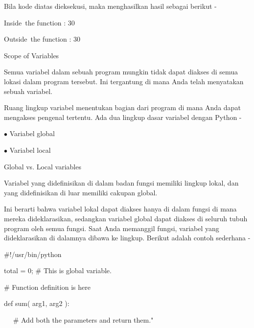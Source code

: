 \noindent 
Bila kode diatas dieksekusi, maka menghasilkan hasil sebagai berikut - \par
\noindent 
 \hspace*{0.5in} Inside~the function :  30 \par
\noindent 
 \hspace*{0.5in} Outside~the function :  30 \par
\noindent 
Scope of Variables \par
\noindent 
Semua variabel dalam sebuah program mungkin tidak dapat diakses di semua lokasi dalam program tersebut. Ini tergantung di mana Anda telah menyatakan sebuah variabel. \par
\noindent 
Ruang lingkup variabel menentukan bagian dari program di mana Anda dapat mengakses pengenal tertentu. Ada dua lingkup dasar variabel dengan Python - \par
\noindent 
 \hspace*{0.5in}  $ \bullet $ Variabel global \par
\noindent 
 \hspace*{0.5in}  $ \bullet $ Variabel local \par
\vspace{12pt}
\noindent 
Global vs. Local variables \par
\noindent 
Variabel yang didefinisikan di dalam badan fungsi memiliki lingkup lokal, dan yang didefinisikan di luar memiliki cakupan global. \par
\noindent 
Ini berarti bahwa variabel lokal dapat diakses hanya di dalam fungsi di mana mereka dideklarasikan, sedangkan variabel global dapat diakses di seluruh tubuh program oleh semua fungsi. Saat Anda memanggil fungsi, variabel yang dideklarasikan di dalamnya dibawa ke lingkup. Berikut adalah contoh sederhana - \par
\noindent 
 \hspace*{0.5in}  $  \#  $!/usr/bin/python \par
\vspace{12pt}
\noindent 
 \hspace*{0.5in} total = 0;  $  \#  $ This is global variable. \par
\noindent 
 \hspace*{0.5in}  $  \#  $ Function definition is here \par
\noindent 
 \hspace*{0.5in} def sum( arg1, arg2 ): \par
\noindent 
 \hspace*{0.5in} ~~  $  \#  $ Add both the parameters and return them." \par
